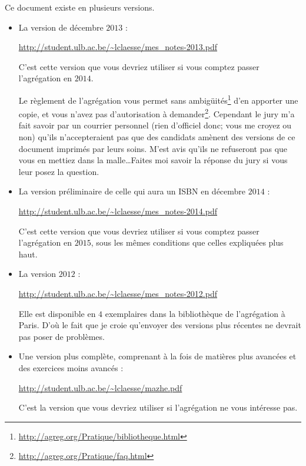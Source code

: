 Ce document existe en plusieurs versions.
\begin{itemize}
    \item
        La version de décembre \( 2013\) :
        \begin{center}
            \url{http://student.ulb.ac.be/~lclaesse/mes_notes-2013.pdf}
        \end{center}
        C'est cette version que vous devriez utiliser si vous comptez passer l'agrégation en $2014$.
        
        Le règlement de l'agrégation vous permet sans ambigüités\footnote{\url{http://agreg.org/Pratique/bibliotheque.html}} d'en apporter une copie, et vous n'avez pas d'autorisation à demander\footnote{\url{http://agreg.org/Pratique/faq.html}}. Cependant le jury m'a fait savoir par un courrier personnel (rien d'officiel donc; vous me croyez ou non) qu'ils n'accepteraient pas que des candidats amènent des versions de ce document imprimés par leurs soins. M'est avis qu'ils ne refuseront pas que vous en mettiez dans la malle\ldots Faites moi savoir la réponse du jury si vous leur posez la question.

    \item 
        La version préliminaire de celle qui aura un ISBN en décembre $2014$ :
        \begin{center}
        \url{http://student.ulb.ac.be/~lclaesse/mes_notes-2014.pdf}
        \end{center}

        C'est cette version que vous devriez utiliser si vous comptez passer l'agrégation en $2015$, sous les mêmes conditions que celles expliquées plus haut.
        
    \item

        La version \( 2012\) :  
        \begin{center}
        \url{http://student.ulb.ac.be/~lclaesse/mes_notes-2012.pdf}
        \end{center}

        Elle est disponible en \( 4\) exemplaires dans la bibliothèque de l'agrégation à Paris. D'où le fait que je croie qu'envoyer des versions plus récentes ne devrait pas poser de problèmes.

    \item

        Une version plus complète, comprenant à la fois de matières plus avancées et des exercices moins avancés : 
        \begin{center}
        \url{http://student.ulb.ac.be/~lclaesse/mazhe.pdf}
        \end{center}

        C'est la version que vous devriez utiliser si l'agrégation ne vous intéresse pas.

\end{itemize}


\vfill

\LogoEtLicence
\clearpage
